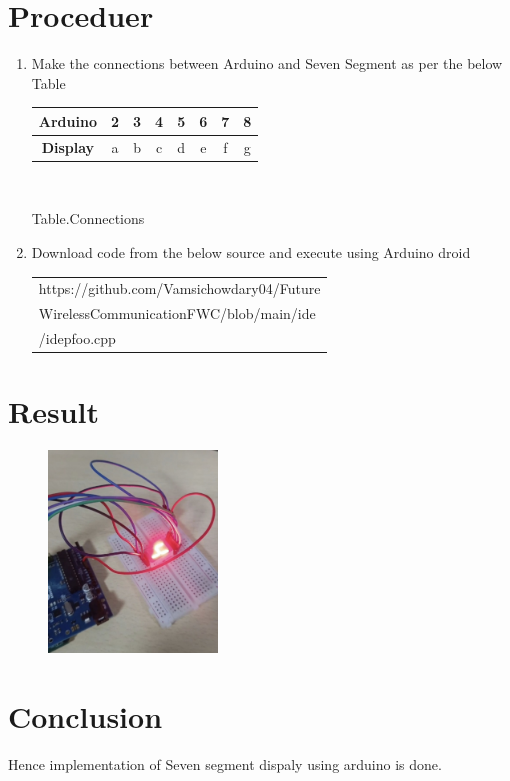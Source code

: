 \documentclass[journal,12pt,twocolumn]{IEEEtran}
\theoremstyle{remark}
\begin{document}
\section{Proceduer}
\begin{enumerate}
    \item Make the connections between Arduino and Seven Segment as per the below Table


\begin{table}[h!]
    \centering
    \small  %
    \begin{tabular}{|c|c|c|c|c|c|c|c|}
        \hline
        \textbf{Arduino}  & 2 & 3 & 4 & 5 & 6 & 7 & 8\\
        \hline
        \textbf{Display} &a&b&c&d&e&f&g\\
        \hline
    \end{tabular}\\
     \begin{center} 
 Table.Connections
 \end{center}
\end{table} 
    \item Download code from the below source and execute using Arduino droid \\

    \begin{tabularx}{0.46\textwidth} { 
  | >{\centering\arraybackslash}X |}
  \hline
   https://github.com/Vamsichowdary04/Future\\\-Wireless\-Communication\-FWC\-/blob/main/ide\\/idepfoo.cpp\\
  \hline
\end{tabularx}
 
\end{enumerate}


\section{Result}
\begin{figure}[h] 
	\centering 
	\includegraphics[width=0.4\textwidth]{ss02.jpg}
\centering	
\caption{\label{fig:Gate}}    
\end{figure}

\section{Conclusion}
Hence implementation of Seven segment dispaly using arduino is done.
\end{document}
